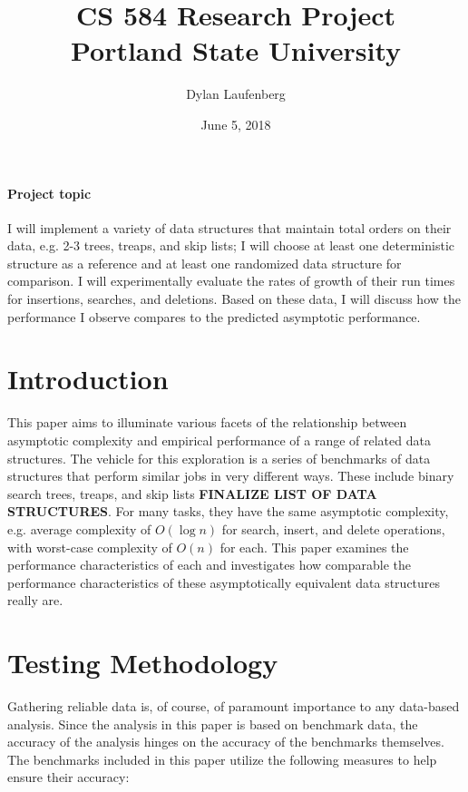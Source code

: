 \documentclass{article}
\title{CS 584 Research Project \\ \large Portland State University}
\author{ Dylan Laufenberg }
\date{June 5, 2018}
\newcommand {\todo}[1] {{\textbf{\color{red}#1}}}
\begin{document}
\maketitle

\paragraph{Project topic} I will implement a variety of data structures that maintain total orders on their data, e.g. 2-3 trees, treaps, and skip lists; I will choose at least one deterministic structure as a reference and at least one randomized data structure for comparison. I will experimentally evaluate the rates of growth of their run times for insertions, searches, and deletions. Based on these data, I will discuss how the performance I observe compares to the predicted asymptotic performance.

\section{Introduction}
This paper aims to illuminate various facets of the relationship between asymptotic complexity and empirical performance of a range of related data structures. The vehicle for this exploration is a series of benchmarks of data structures that perform similar jobs in very different ways. These include binary search trees, treaps, and skip lists \todo{FINALIZE LIST OF DATA STRUCTURES}. For many tasks, they have the same asymptotic complexity, e.g. average complexity of $O(\log n)$ for search, insert, and delete operations, with worst-case complexity of $O(n)$ for each. This paper examines the performance characteristics of each and investigates how comparable the performance characteristics of these asymptotically equivalent data structures really are.

\section{Testing Methodology}
Gathering reliable data is, of course, of paramount importance to any data-based analysis. Since the analysis in this paper is based on benchmark data, the accuracy of the analysis hinges on the accuracy of the benchmarks themselves. The benchmarks included in this paper utilize the following measures to help ensure their accuracy:
\end{document}

